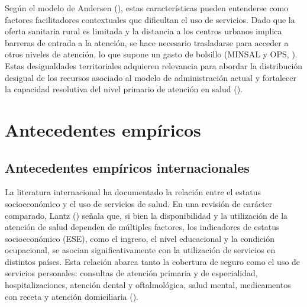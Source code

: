 \documentclass[
  spanish,
  a4paper,
  oneside]{scrbook}
\begin{document}
Según el modelo de Andersen
(), estas características
pueden entenderse como factores facilitadores contextuales que
dificultan el uso de servicios. Dado que la oferta sanitaria rural es
limitada y la distancia a los centros urbanos implica barreras de
entrada a la atención, se hace necesario trasladarse para acceder a
otros niveles de atención, lo que supone un gasto de bolsillo (MINSAL y
OPS, ). Estas
desigualdades territoriales adquieren relevancia para abordar la
distribución desigual de los recursos asociado al modelo de
administración actual y fortalecer la capacidad resolutiva del nivel
primario de atención en salud
().


\chapter{Antecedentes empíricos}\label{antecedentes-empuxedricos}

\section{Antecedentes empíricos
internacionales}\label{antecedentes-empuxedricos-internacionales}

La literatura internacional ha documentado la relación entre el estatus
socioeconómico y el uso de servicios de salud. En una revisión de
carácter comparado, Lantz
() señala que, si bien la
disponibilidad y la utilización de la atención de salud dependen de
múltiples factores, los indicadores de estatus socioeconómico (ESE),
como el ingreso, el nivel educacional y la condición ocupacional, se
asocian significativamente con la utilización de servicios en distintos
países. Esta relación abarca tanto la cobertura de seguro como el uso de
servicios personales: consultas de atención primaria y de especialidad,
hospitalizaciones, atención dental y oftalmológica, salud mental,
medicamentos con receta y atención domiciliaria
().
\end{document}
